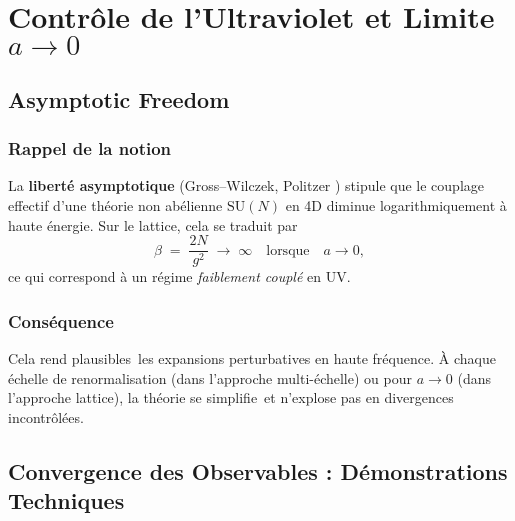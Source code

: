 \chapter{Contrôle de l’Ultraviolet et Limite \texorpdfstring{\(a \to 0\)}{(a -> 0)}}
\label{chap:7}

\section{Asymptotic Freedom}
\label{sec:7.1}

\subsection*{Rappel de la notion}
La \textbf{liberté asymptotique} (Gross--Wilczek, Politzer \cite{GrossWilczek1973,Politzer1973}) stipule que le couplage effectif d’une théorie non abélienne \(\mathrm{SU}(N)\) en 4D diminue logarithmiquement à haute énergie. Sur le lattice, cela se traduit par
\[
\beta \;=\;\frac{2N}{g^2} \;\longrightarrow\; \infty
\quad\text{lorsque}\quad a \to 0,
\]
ce qui correspond à un régime \emph{faiblement couplé} en UV.

\subsection*{Conséquence}
Cela rend \og plausibles\fg\ les expansions perturbatives en haute fréquence. À chaque échelle de renormalisation (dans l’approche multi-échelle) ou pour \(a\to 0\) (dans l’approche lattice), la théorie se \og simplifie\fg\ et n’explose pas en divergences incontrôlées.

\vspace{1em}

\section{Convergence des Observables : Démonstrations Techniques}
\label{sec:7.2}

